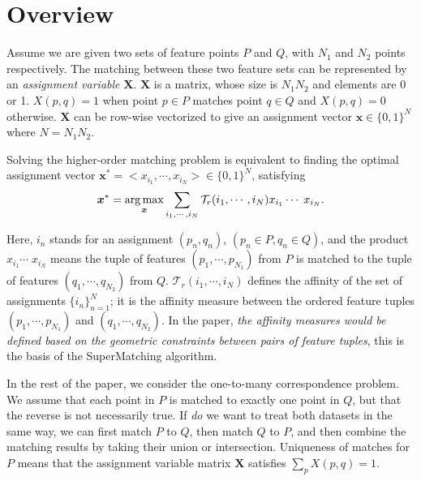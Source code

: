 \section{Overview}
\label{sec:overview}

Assume we are given two sets of feature points $P$ and $Q$, with $N_1$  and $N_2$ points respectively.
The matching between these two feature sets can be represented by an \emph{assignment variable} $\mathbf{X}$.
$\mathbf{X}$ is a matrix, whose size is $N_1N_2$ and elements are 0 or 1.
$X(p,q)=1$ when point $p \in P$ matches point $q \in Q$ and $X(p,q)=0$ otherwise.
$\mathbf{X}$ can be row-wise vectorized to give an assignment vector $\boldsymbol{x} \in \{0,1\}^N$ where $N={N_1N_2}$.

Solving the higher-order matching problem is equivalent to finding the optimal assignment vector ${\boldsymbol{x}}^*=<x_{i_1},\cdots,x_{i_N}>
 \in \{0,1\}^{N}$, satisfying
\begin{equation}
\label{equ:assigment}
  {\boldsymbol{x}}^* = \operatorname*{arg\,max}_{\boldsymbol{x}}  \sum_{i_1,\cdots,i_N} \mathcal{T}_r(i_1,\cdots,i_N) x_{i_1}  \cdots\; x_{i_N}.
\end{equation}

Here, $i_n$ stands for an assignment $(p_n,q_n)$, $(p_n\in P, q_n\in Q)$, and the
product $x_{i_1} \cdots\;x_{i_N}$ means the tuple of features $(p_1,\cdots,p_{N_1})$ from $P$ is matched to the tuple of features $(q_1,\cdots,q_{N_2})$ from $Q$.
$\mathcal{T}_r(i_1,\cdots,i_N)$ defines the affinity of the set of assignments $\{i_n\}_{n=1}^N$;
it is the affinity measure between the ordered feature tuples $(p_1,\cdots,p_{N_1})$  and $(q_1,\cdots,q_{N_2})$.
In the paper, \emph{the affinity measures would be defined based on the geometric constraints between pairs of feature tuples},
this is the basis of the SuperMatching algorithm.

In the rest of the paper, we consider the one-to-many correspondence problem.
We assume that each point in $P$ is matched to exactly one point in $Q$, but that the reverse is not necessarily true.
If \emph{do} we want to treat both datasets in the same way,
we can first match $P$ to $Q$, then match $Q$ to $P$, and then combine the matching results by taking their union or intersection.
Uniqueness of matches for $P$ means that the assignment variable matrix $\mathbf{X}$ satisfies $\sum\nolimits_p X(p,q)=1$.

